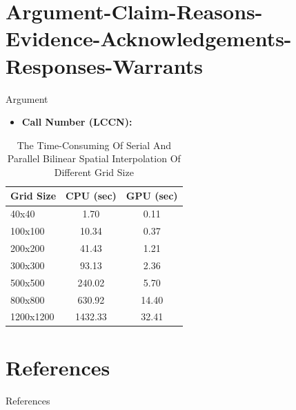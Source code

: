 \documentclass{beamer}
\begin{document}
\section{Argument-Claim-Reasons-Evidence-Acknowledgements-Responses-Warrants}	
	\begin{frame}
		\begin{block}{Argument}
		\end{block}
		\begin{itemize}
			 \item \textbf{Call Number (LCCN):} 
		\end{itemize}
	\end{frame}
	\begin{frame}
	\begin{table}[H] %
			\centering	
			\caption[The Time-Consuming Of Serial And Parallel Bilinear Spatial Interpolation Of Different Grid Size]{\justifying The Time-Consuming Of Serial And Parallel Bilinear Spatial Interpolation Of Different Grid Size}
			\label{tab:table_1}
			\begin{tabular}{l c c }
				Grid Size & CPU (sec) & GPU (sec)\\ \hline
				40x40 & 1.70 & 0.11 \\  
				100x100 & 10.34 & 0.37 \\ 
				200x200 & 41.43 & 1.21 \\ 
				300x300 & 93.13 & 2.36 \\ 
				500x500 & 240.02 & 5.70 \\ 
				800x800 & 630.92 & 14.40 \\ 
				1200x1200 & 1432.33 &  32.41 \\ \hline
			\end{tabular}
		\end{table}
	\end{frame}
	
\section{References}
	\begin{block}{References}
	\end{block}
%	
%	
\end{document}
